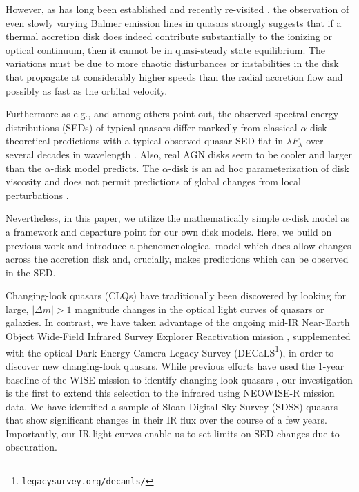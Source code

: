 \documentclass[a4paper,fleqn,usenatbib]{mnras}
\begin{document}
{However, as has long been established \citep[e.g., ][]{Alloin1985} and recently re-visited \citep[e.g., ][]{LaMassa2015, Runnoe2016, MacLeod2016, Ruan2016, Rumbaugh2017, Yang2017, Lawrence2018}, the observation of even slowly varying Balmer emission lines in quasars strongly suggests that if a thermal accretion disk does indeed contribute substantially to the ionizing or optical continuum, then it cannot be in quasi-steady state equilibrium. The variations must be due to more chaotic disturbances or instabilities in the disk that propagate at considerably higher speeds than the radial accretion flow and possibly as fast as the orbital velocity.

Furthermore as e.g., \citet{Koratkar_Blaes1999} and \citet{Sirko_Goodman2003} among others point out, the observed spectral energy distributions (SEDs) of typical quasars differ markedly from classical $\alpha$-disk theoretical predictions \citep[][]{SS73, Pringle1981} with a typical observed quasar SED flat in $\lambda F_{\lambda}$ over several decades in wavelength \citep{Elvis1994, Richards2006b}. Also, real AGN disks seem to be cooler \citep[e.g., ][]{Lawrence2012} and larger \citep[e.g.,][]{Pooley2007, Morgan2010, Morgan2012, Mosquera2011} than the $\alpha$-disk model predicts. The $\alpha$-disk is an ad hoc parameterization of disk viscosity and does not permit predictions of global changes from local perturbations \citep{King2012}. 

Nevertheless, in this paper, we utilize the mathematically simple $\alpha$-disk model as a framework and departure point for our own disk models. Here, we build on previous work \citep{Sirko_Goodman2003, Zimmerman2005, Hameury2009} and introduce a phenomenological model which does allow changes across the accretion disk and, crucially, makes predictions which can be observed in the SED.
}

Changing-look quasars (CLQs) have traditionally been discovered by looking for large, $| \Delta m | >1$ magnitude changes in the optical light curves of quasars or galaxies. In contrast, we have taken advantage of the ongoing mid-IR Near-Earth Object Wide-Field Infrared Survey Explorer Reactivation mission \citep[NEOWISE-R; ][]{Mainzer2014, Meisner2017a, Meisner2017b}, supplemented with the optical Dark Energy Camera Legacy Survey (DECaLS\footnote{{\tt legacysurvey.org/decamls/}}), in order to discover new changing-look quasars.  While previous efforts have used the 1-year baseline of the WISE mission to identify changing-look quasars \citep[e.g.,][]{Assef2018, Stern2018}, our investigation is the first to extend this selection to the infrared using NEOWISE-R mission data. We have identified a sample of Sloan Digital Sky Survey (SDSS) quasars that show significant changes in their IR flux over the course of a few years. Importantly, our IR light curves enable us to set limits on SED changes due to obscuration.
\end{document}

